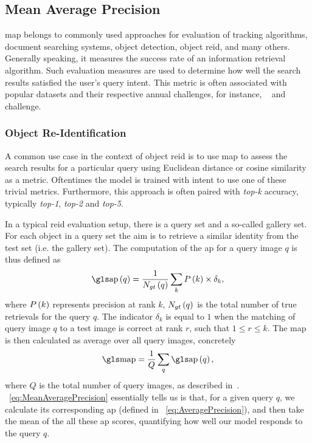 \subsection{Mean Average Precision}
\label{ssec:MeanAveragePrecision}


\Gls{map} belongs to commonly used approaches for evaluation of tracking algorithms, document searching systems, object detection, object \gls{reid}, and many others. Generally speaking, it measures the success rate of an information retrieval algorithm. Such evaluation measures are used to determine how well the search results satisfied the user's query intent. This metric is often associated with popular datasets and their respective annual challenges, for instance, \pascalvoc{}~\cite{everingham2010pascalvoc} and \mscoco{}~\cite{lin2014mscoco} challenge.

\subsubsection{Object Re-Identification}
\label{sssec:ObjectReIdentification}

A common use case in the context of object \gls{reid} is to use \gls{map} to assess the search results for a particular query using Euclidean distance or cosine similarity as a metric. Oftentimes the model is trained with intent to use one of these trivial metrics. Furthermore, this approach is often paired with \emph{top-k} accuracy, typically \emph{top-1}, \emph{top-2} and \emph{top-5}.

In a typical \gls{reid} evaluation setup, there is a query set and a so-called gallery set. For each object in a query set the aim is to retrieve a similar identity from the test set (i.e. the gallery set). The computation of the \gls{ap} for a query image $q$ is thus defined as
\begin{equation}
    \label{eq:AveragePrecision}
    \func{\AP}{q} = \frac{1}{\func{N_{gt}}{q}} \sum_{k} \func{P}{k} \times {\delta}_k,
\end{equation}
where ${P} \left( k \right)$ represents precision at rank $k$, ${N_{gt}} \left( q \right)$ is the total number of true retrievals for the query $q$. The indicator ${\delta}_k$ is equal to $1$ when the matching of query image $q$ to a test image is correct at rank $r$, such that $1 \leq r \leq k$. The \gls{map} is then calculated as average over all query images, concretely
\begin{equation}
    \label{eq:MeanAveragePrecision}
    \MAP = \frac{1}{Q} \sum_q \func{\AP}{q},
\end{equation}
where $Q$ is the total number of query images, as described in~\cite{kuma2019vehiclereid}. \eqstr{}~\ref{eq:MeanAveragePrecision} essentially tells us is that, for a given query $q$, we calculate its corresponding \gls{ap} (defined in \eqstr{}~\ref{eq:AveragePrecision}), and then take the mean of the all these \gls{ap} scores, quantifying how well our model responds to the query $q$.

